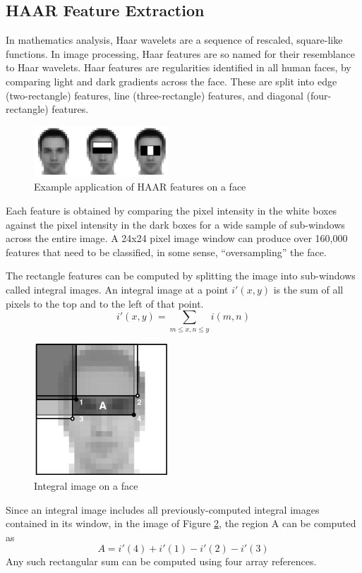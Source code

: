 \documentclass[journal]{IEEEtran}
\begin{document}
\subsection{HAAR Feature Extraction}
In mathematics analysis, Haar wavelets are a sequence of rescaled, square-like functions. In image processing, Haar features are so named for their resemblance to Haar wavelets. Haar features are regularities identified in all human faces, by comparing light and dark gradients across the face. These are split into edge (two-rectangle) features, line (three-rectangle) features, and diagonal (four-rectangle) features.
\begin{figure}[h]
	\centering
	\includegraphics[width=0.45\textwidth]{haar_features.png}
	\caption{Example application of HAAR features on a face}
    \label{haar-features-face-example}
\end{figure}
\par Each feature is obtained by comparing the pixel intensity in the white boxes against the pixel intensity in the dark boxes for a wide sample of sub-windows across the entire image. A 24x24 pixel image window can produce over 160,000 features that need to be classified, in some sense, “oversampling” the face.
\par The rectangle features can be computed by splitting the image into sub-windows called integral images. An integral image at a point $i'(x, y)$ is the sum of all pixels to the top and to the left of that point.
\[
i'(x, y) = \sum_{m \leq x, n \leq y}{i(m, n)}
\]
\begin{figure}[h]
	\centering
	\includegraphics[width=0.45\textwidth]{integral_image.png}
	\caption{Integral image on a face}
    \label{integral-image-face}
\end{figure}
Since an integral image includes all previously-computed integral images contained in its window, in the image of Figure \ref{integral-image-face}, the region A can be computed as
\[
A = i'(4) + i'(1) - i'(2) - i'(3)
\]
Any such rectangular sum can be computed using four array references.
\end{document}
